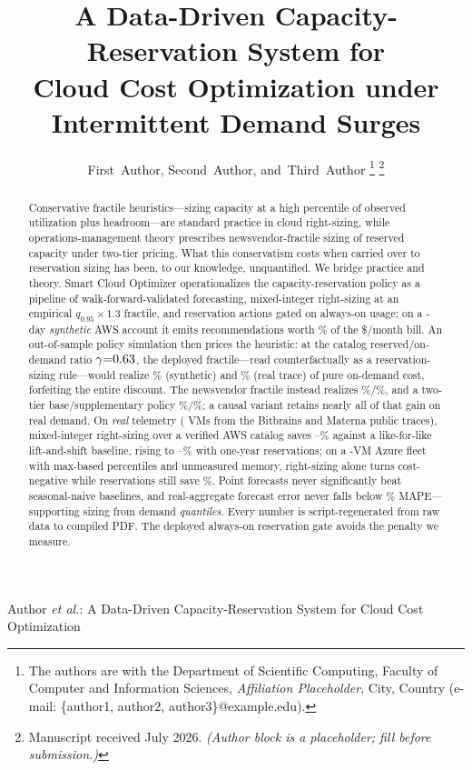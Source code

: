 \documentclass[10pt,journal]{IEEEtran}
\begin{document}
\title{A Data-Driven Capacity-Reservation System for\\
Cloud Cost Optimization under Intermittent Demand Surges}

\author{First~Author,
        Second~Author,
        and~Third~Author%
\thanks{The authors are with the Department of Scientific Computing, Faculty
of Computer and Information Sciences, \textit{Affiliation Placeholder}, City,
Country (e-mail: \{author1, author2, author3\}@example.edu).}%
\thanks{Manuscript received July 2026. \textit{(Author block is a placeholder;
fill before submission.)}}}

%
{Author \MakeLowercase{\textit{et al.}}: A Data-Driven Capacity-Reservation System for Cloud Cost Optimization}

\maketitle

\begin{abstract}
Conservative fractile heuristics---sizing capacity at a high percentile of
observed utilization plus headroom---are standard practice in cloud
right-sizing, while operations-management theory prescribes
newsvendor-fractile sizing of reserved capacity under two-tier pricing. What
this conservatism costs when carried over to reservation sizing has been, to
our knowledge, unquantified. We bridge practice and theory. Smart Cloud Optimizer
operationalizes the capacity-reservation policy as a pipeline of
walk-forward-validated forecasting, mixed-integer right-sizing at an
empirical $q_{0.95}{\times}1.3$ fractile, and reservation actions gated on
always-on usage; on a \nDays-day \emph{synthetic} AWS account it emits
\numRecs{} recommendations worth \savingsPctBill\% of the \$\totalBill/month
bill. An out-of-sample policy simulation then prices the heuristic: at the
catalog reserved/on-demand ratio $\gamma{=}0.63$, the deployed
fractile---read counterfactually as a reservation-sizing rule---would
realize \polPctHeur\% (synthetic) and
\extPolPctHeur\% (real trace) of pure on-demand cost, forfeiting the entire
discount. The newsvendor fractile instead realizes
\polPctNv\%/\extPolPctNv\%, and a two-tier base/supplementary policy
\polPctDual\%/\extPolPctDual\%; a causal variant retains nearly all of that
gain on real demand. On \emph{real} telemetry
(\extTotalVms{} VMs from the Bitbrains and Materna public traces),
mixed-integer right-sizing over a verified AWS catalog saves
\extRndSavingsPct--\extMatSavingsPct\% against a like-for-like
lift-and-shift baseline, rising to
\extRndSavingsPctRi--\extMatSavingsPctRi\% with one-year reservations; on a
\azVms-VM Azure fleet with max-based percentiles and unmeasured memory,
right-sizing alone turns cost-negative while reservations still save
\azSavingsPctRi\%. Point
forecasts never significantly beat seasonal-naive baselines, and
real-aggregate forecast error never falls below \extAnyBestMape\%
MAPE---supporting sizing from demand \emph{quantiles}. Every number is
script-regenerated from raw data to compiled PDF. The deployed always-on
reservation gate avoids the penalty we measure.
\end{abstract}
\end{document}

